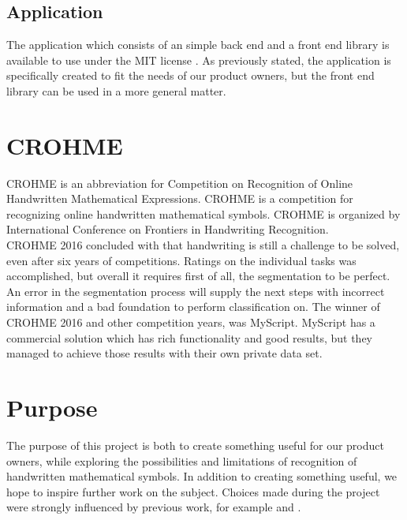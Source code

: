 \subsection{Application}
The application which consists of an simple back end and a front end library is available to use under the MIT license \parencite{_mit_????}. As previously stated, the application is specifically created to fit the needs of our product owners, but the front end library can be used in a more general matter. %


\section{CROHME}
CROHME is an abbreviation for Competition on Recognition of Online Handwritten Mathematical Expressions.
CROHME is a competition for recognizing online handwritten mathematical symbols. CROHME is organized by International Conference on Frontiers in Handwriting Recognition. \\ 
CROHME 2016 \parencite{mouchere_icfhr2016_2016} concluded with that handwriting is still a challenge to be solved, even after six years of competitions. Ratings on the individual tasks was accomplished, but overall it requires first of all, the segmentation to be perfect. An error in the segmentation process will supply the next steps with incorrect information and a bad foundation to perform classification on.
The winner of CROHME 2016 and other competition years, was MyScript. MyScript has a commercial solution which has rich functionality and good results, but they managed to achieve those results with their own private data set. \parencite{mouchere_icfhr2016_2016}  \\ 

\section{Purpose}

The purpose of this project is both to create something useful for our product owners, while exploring the possibilities and limitations of recognition of handwritten mathematical symbols. In addition to creating something useful, we hope to inspire further work on the subject. Choices made during the project were strongly influenced by previous work, for example \cite{thoma_-line_2015} and \cite{lu_recognition_????}.
